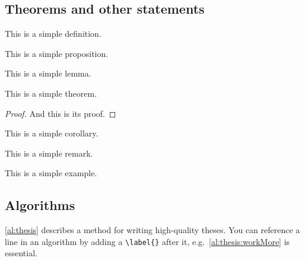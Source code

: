 \subsection{Theorems and other statements}
\begin{dfn}
  This is a simple definition.
\end{dfn}

\begin{prp}
  This is a simple proposition.
\end{prp}

\begin{lem}
  This is a simple lemma.
\end{lem}

\begin{thm}
  This is a simple theorem.
\end{thm}
\begin{proof}
  And this is its proof.
\end{proof}

\begin{cor}
  This is a simple corollary.
\end{cor}

\begin{rem}
  This is a simple remark.
\end{rem}

\begin{exa}
  This is a simple example.
\end{exa}


\subsection{Algorithms}
\cref{al:thesis} describes a method for writing high-quality theses.
You can reference a line in an algorithm by adding a \verb|\label{}|
after it, e.g.\ \cref{al:thesis:workMore} is essential.

\begin{algorithm}
  \caption{How to write a thesis}
  \label{al:thesis}
\end{algorithm}


